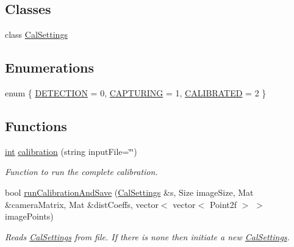 \subsection*{Classes}
\begin{DoxyCompactItemize}
\item 
class \mbox{\hyperlink{class_cal_settings}{Cal\+Settings}}
\end{DoxyCompactItemize}
\subsection*{Enumerations}
\begin{DoxyCompactItemize}
\item 
enum \{ \mbox{\hyperlink{calibration_8hh_a06fc87d81c62e9abb8790b6e5713c55ba167a7ee1aabe9f27e010fff93c0ba971}{D\+E\+T\+E\+C\+T\+I\+ON}} = 0, 
\mbox{\hyperlink{calibration_8hh_a06fc87d81c62e9abb8790b6e5713c55ba53f5d985011ab26db21516188f46a94f}{C\+A\+P\+T\+U\+R\+I\+NG}} = 1, 
\mbox{\hyperlink{calibration_8hh_a06fc87d81c62e9abb8790b6e5713c55baf7834eaf5a327e180e039aa05dd3ebd1}{C\+A\+L\+I\+B\+R\+A\+T\+ED}} = 2
 \}
\end{DoxyCompactItemize}
\subsection*{Functions}
\begin{DoxyCompactItemize}
\item 
\mbox{\hyperlink{draw_8hh_aa620a13339ac3a1177c86edc549fda9b}{int}} \mbox{\hyperlink{calibration_8hh_aad0d20455c4c17ca2922fec15835fe94}{calibration}} (string input\+File=\char`\"{}\char`\"{})
\begin{DoxyCompactList}\small\item\em Function to run the complete calibration. \end{DoxyCompactList}\item 
bool \mbox{\hyperlink{calibration_8hh_a4195037da024926ac4f645bd09700052}{run\+Calibration\+And\+Save}} (\mbox{\hyperlink{class_cal_settings}{Cal\+Settings}} \&s, Size image\+Size, Mat \&camera\+Matrix, Mat \&dist\+Coeffs, vector$<$ vector$<$ Point2f $>$ $>$ image\+Points)
\begin{DoxyCompactList}\small\item\em Reads \mbox{\hyperlink{class_cal_settings}{Cal\+Settings}} from file. If there is none then initiate a new {\ttfamily \mbox{\hyperlink{class_cal_settings}{Cal\+Settings}}}. \end{DoxyCompactList}\end{DoxyCompactItemize}
